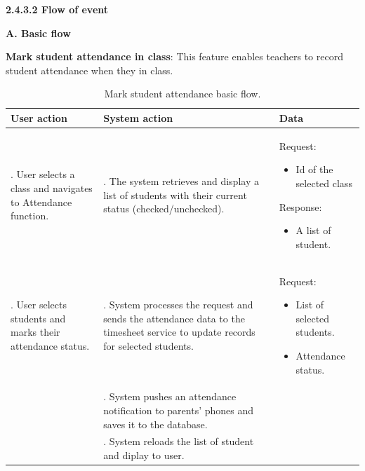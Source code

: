 \vspace{0.5em}
\indent\textbf{2.4.3.2 Flow of event}
\vspace{0.5em}
\par\indent\indent\textbf{A. Basic flow}
\vspace{1em}
\par\indent\indent\indent\parbox{0.87\textwidth}{\textbf{Mark student attendance in class}: This feature enables teachers to record student attendance when they in class.}
\vspace{-1em}
\renewcommand{\arraystretch}{1.5}
\begin{longtable}{|>{\raggedright\arraybackslash}p{4.5cm}|
                  >{\raggedright\arraybackslash}p{6cm}|
                  >{\raggedright\arraybackslash}p{4.5cm}|}                  
\caption{Mark student attendance basic flow.}
\label{tab:student_attendance_mark_presence_class_basic_flow}\\
\hline
\centering\textbf{User action} & \centering\textbf{System action} & \centering\arraybackslash\textbf{Data} \\
\hline
\endfirsthead
\endhead

1. User selects a class and navigates to Attendance function. & 2. The system retrieves and display a list of students with their current status (checked/unchecked).& 
    \par{Request:
        \vspace{-0.8em}
        \begin{itemize}
            \item Id of the selected class
        \end{itemize}
    } 
    \vspace{-0.8em}
    \par{Response: 
        \vspace{-0.8em}
        \begin{itemize}
            \item A list of student.
            \vspace{-1.5em}
        \end{itemize}
    }\\
\hline
3. User selects students and marks their attendance status.&4. System processes the request and sends the attendance data to the timesheet service to update records for selected students.&
\par{Request: 
        \vspace{-0.8em}
        \begin{itemize}
            \item List of selected students.
            \vspace{-0.8em}
            \item Attendance status.
            \vspace{-2.5em}
        \end{itemize}
    }\\
\hline
&5. System pushes an attendance notification to parents' phones and saves it to the database.&\\
\hline
&6. System reloads the list of student and diplay to user.&\\
\hline
\end{longtable}

